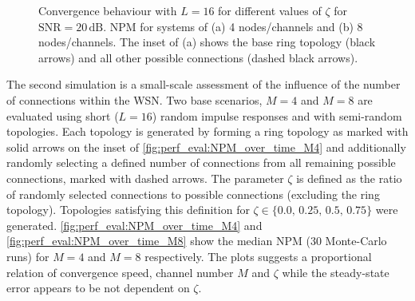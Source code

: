 \documentclass{article}
\begin{document}
\begin{figure}[t]
    \centering
    \hspace*{-0.2cm}
    \hspace*{-0.0cm}
    \vspace*{-0.2cm}
    \caption[Convergence behaviour with \(L\!=\!16\) for different values of \(\zeta\)]{Convergence behaviour with \(L\!=\!16\) for different values of \(\zeta\) for \(\text{SNR}=20\,\text{dB}\). NPM for systems of (a) 4 nodes/channels and (b) 8 nodes/channels. The inset of (a) shows the base ring topology (black arrows) and all other possible connections (dashed black arrows).}
    \label{fig:perf_eval:NPM_over_time_exp2}
\end{figure}

The second simulation is a small-scale assessment of the influence of the number of connections within the WSN.
Two base scenarios, \(M=4\) and \(M=8\) are evaluated using short (\(L=16\)) random impulse responses and with semi-random topologies.
Each topology is generated by forming a ring topology as marked with solid arrows on the inset of \autoref{fig:perf_eval:NPM_over_time_M4} and additionally randomly selecting a defined number of connections from all remaining possible connections, marked with dashed arrows.
The parameter \(\zeta\) is defined as the ratio of randomly selected connections to possible connections (excluding the ring topology).
Topologies satisfying this definition for \(\zeta \in \{0.0,\,0.25,\,0.5,\,0.75\}\) were generated.
\autoref{fig:perf_eval:NPM_over_time_M4} and \autoref{fig:perf_eval:NPM_over_time_M8} show the median NPM (30 Monte-Carlo runs) for \(M=4\) and \(M=8\) respectively. The plots suggests a proportional relation of convergence speed, channel number \(M\) and \(\zeta\) while the steady-state error appears to be not dependent on \(\zeta\).
\end{document}
